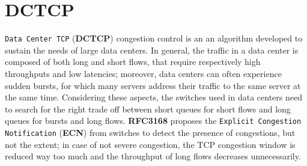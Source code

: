 \documentclass{exam}
\begin{document}
\section{DCTCP}
\texttt{Data Center TCP} (\textbf{DCTCP}) congestion control is an an algorithm developed to sustain the needs of large data centers. In general, the traffic in a data center is composed of both long and short flows, that require respectively high throughputs and low latencies; moreover, data centers can often experience sudden bursts, for which many servers address their traffic to the same server at the same time. Considering these aspects, the switches used in data centers need to search for the right trade off between short queues for short flows and long queues for bursts and long flows. \textbf{RFC3168} proposes the \texttt{Explicit Congestion Notification} (\textbf{ECN}) from switches to detect the presence of congestions, but not the extent; in case of not severe congestion, the TCP congestion window is reduced way too much and the throughput of long flows decreases unnecessarily.
\end{document}
